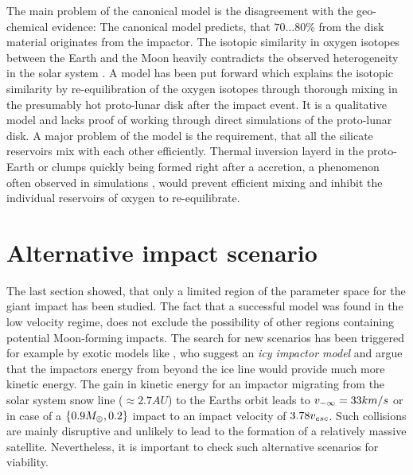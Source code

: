 The main problem of the canonical model is the disagreement with the geo-chemical evidence: The canonical model predicts, that $70 \dots 80 \%$ from the disk material originates from the impactor. The isotopic similarity in oxygen isotopes between the Earth and the Moon heavily contradicts the observed heterogeneity in the solar system \citep{Wiechert:2001p3543}. A model has been put forward \citep{Pahlevan:2007p2065, 2011E&PSL.301..433P} which explains the isotopic similarity by re-equilibration of the oxygen isotopes through thorough mixing in the presumably hot proto-lunar disk after the impact event. It is a qualitative model and lacks proof of working through direct simulations of the proto-lunar disk. A major problem of the model is the requirement, that all the silicate reservoirs mix with each other efficiently. Thermal inversion layerd in the proto-Earth or clumps quickly being formed right after a accretion, a phenomenon often observed in simulations \citep{1997Icar..126..126C, Cameron:2000p1854, Canup:2001p1861, Canup:2004p115}, would prevent efficient mixing and inhibit the individual reservoirs of oxygen to re-equilibrate.

\section{Alternative impact scenario}
The last section showed, that only a limited region of the parameter space for the giant impact has been studied. The fact that a successful model was found in the low velocity regime, does not exclude the possibility of other regions containing potential Moon-forming impacts. The search for new scenarios has been triggered for example by exotic models like \cite{2010M&PSA..73.5140W}, who suggest an \emph{icy impactor model} and argue that the impactors energy from beyond the ice line would provide much more kinetic energy. The gain in kinetic energy for an impactor migrating from the solar system snow line ($\approx 2.7 AU$) to the Earths orbit leads to $v_{-\infty} = 33 km/s$ or in case of a $\{0.9 M_{\oplus}, 0.2\}$ impact to an impact velocity of $3.78 v_{esc}$. Such collisions are mainly disruptive and unlikely to lead to the formation of a relatively massive satellite. Nevertheless, it is important to check such alternative scenarios for viability.


